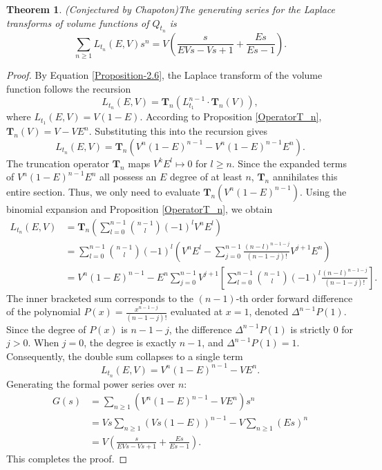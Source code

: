 \documentclass[reqno, 12pt]{article}
\newtheorem{thm}{Theorem}[section]
\theoremstyle{mydefinition}
\theoremstyle{myremark}
\begin{document}
\begin{thm}{\em (Conjectured by Chapoton)}\label{Arbor-Theorem-4}
The generating series for the Laplace transforms of volume functions of $Q_{t_n}$ is
\[ \sum_{n \ge 1} L_{t_n}(E,V) s^n = V \left( \frac{s}{EVs - Vs + 1} + \frac{Es}{Es - 1} \right). \]
\end{thm}
\begin{proof}
By Equation \eqref{Proposition-2.6}, the Laplace transform of the volume function follows the recursion
$$L_{t_n}(E,V) = \mathbf{T}_n \left( L_{t_1}^{n-1} \cdot \mathbf{T}_n(V) \right),$$
where $L_{t_1}(E,V) = V(1-E)$. According to Proposition \ref{OperatorT_n}, $\mathbf{T}_n(V) = V - VE^n$. Substituting this into the recursion gives
$$L_{t_n}(E,V) = \mathbf{T}_n \left( V^n(1-E)^{n-1} - V^n(1-E)^{n-1}E^n \right).$$
The truncation operator $\mathbf{T}_n$ maps $V^k E^l \mapsto 0$ for $l \ge n$. Since the expanded terms of $V^n(1-E)^{n-1}E^n$ all possess an $E$ degree of at least $n$, $\mathbf{T}_n$ annihilates this entire section. Thus, we only need to evaluate $\mathbf{T}_n \left( V^n(1-E)^{n-1} \right)$.
Using the binomial expansion and Proposition \ref{OperatorT_n}, we obtain
\begin{align*}
L_{t_n}(E,V) &= \mathbf{T}_n \left( \sum_{l=0}^{n-1} \binom{n-1}{l} (-1)^l V^n E^l \right) \\
&=\sum_{l=0}^{n-1} \binom{n-1}{l} (-1)^l\left(V^{n}E^{l}-\sum_{j=0}^{n-1}\frac{(n-l)^{n-1-j}}{(n-1-j)!}V^{j+1}E^{n}\right)\\
&= V^n(1-E)^{n-1} - E^n \sum_{j=0}^{n-1} V^{j+1} \left[ \sum_{l=0}^{n-1} \binom{n-1}{l} (-1)^l \frac{(n-l)^{n-1-j}}{(n-1-j)!} \right].
\end{align*}
The inner bracketed sum corresponds to the $(n-1)$-th order forward difference of the polynomial $P(x) = \frac{x^{n-1-j}}{(n-1-j)!}$ evaluated at $x=1$, denoted $\Delta^{n-1}P(1)$. Since the degree of $P(x)$ is $n-1-j$, the difference $\Delta^{n-1}P(1)$ is strictly $0$ for $j > 0$. When $j=0$, the degree is exactly $n-1$, and $\Delta^{n-1}P(1) = 1$. Consequently, the double sum collapses to a single term
$$L_{t_n}(E,V) = V^n(1-E)^{n-1} - VE^n.$$
Generating the formal power series over $n$:
\begin{align*}
G(s) &= \sum_{n\geq 1} \left( V^n(1-E)^{n-1} - VE^n \right) s^n \\
&= Vs \sum_{n\geq1} (Vs(1-E))^{n-1} - V \sum_{n\geq1} (Es)^n \\
&= V \left( \frac{s}{EVs - Vs + 1} + \frac{Es}{Es - 1} \right).
\end{align*}
This completes the proof.
\end{proof}
\end{document}
